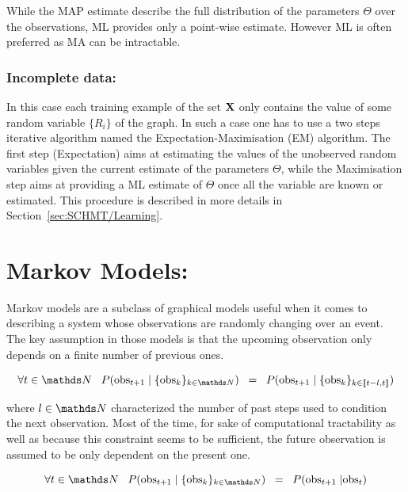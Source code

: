 \documentclass[a4paper,11pt]{report}
\begin{document}
      While the MAP estimate describe the full distribution of the parameters $\Theta$ over the observations, ML provides only a point-wise estimate. However ML is often preferred as MA can be intractable.
      
      \subsubsection{Incomplete data:}

				In this case each training example of the set ${\bf X}$  only contains the value of some random variable $\{R_{i}\}$ of the graph. In such a case one has to use a two steps iterative algorithm named the Expectation-Maximisation (EM) algorithm. The first step (Expectation) aims at estimating the values of the unobserved random variables given the current estimate of the parameters $\Theta$, while the Maximisation step aims at providing a ML estimate of $\Theta$ once all the variable are known or estimated. This procedure is described in more details in Section~\ref{sec:SCHMT/Learning}.
				
  \section{Markov Models:}
    \label{sec:PGMs/MM}
    Markov models are a subclass of graphical models useful when it comes to describing a system whose observations are randomly changing over an event. The key assumption in those models is that the upcoming observation only depends on a finite number of previous ones.
    
    \begin{equation}
      \forall t \in \dsN \;\;\; P(\text{obs}_{t+1} \; | \; \{\text{obs}_{k}\}_{k \in \dsN}) \;\; = \;\; P(\text{obs}_{t+1} \; | \; \{\text{obs}_{k}\}_{k \in \llbracket t-l, t \rrbracket})
      \label{eq:MM assumtion v1}
    \end{equation}
    
    where $l \in \dsN$ characterized the number of past steps used to condition the next observation. Most of the time, for sake of computational tractability as well as because this constraint seems to be sufficient, the future observation is assumed to be only dependent on the present one.  

    \begin{equation}
      \forall t \in \dsN \;\;\; P(\text{obs}_{t+1} \; | \; \{\text{obs}_{k}\}_{k \in \dsN}) \;\; = \;\; P(\text{obs}_{t+1} \; | \text{obs}_{t})
      \label{eq:MM assumtion v2}
    \end{equation}
    
\end{document}
